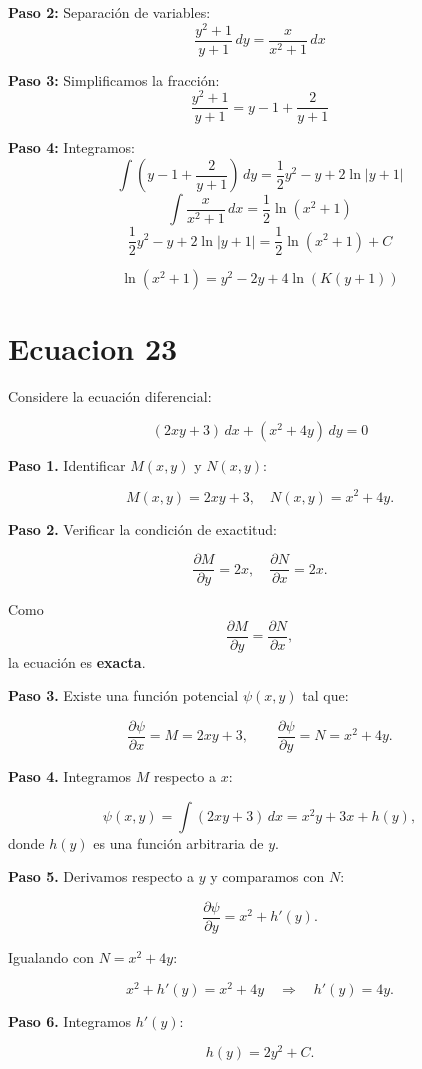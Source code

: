 \documentclass[12pt,a4paper]{article}
\begin{document}
\begin{multicols}{2}
	\textbf{Paso 2:} Separación de variables:
	\[
	\frac{y^2 + 1}{y + 1}\,dy = \frac{x}{x^2 + 1}\,dx
	\]
	
	\textbf{Paso 3:} Simplificamos la fracción:
	\[
	\frac{y^2 + 1}{y + 1} = y - 1 + \frac{2}{y + 1}
	\]
	
	\textbf{Paso 4:} Integramos:
	\[
	\int (y - 1 + \frac{2}{y + 1})\,dy = \frac{1}{2}y^2 - y + 2\ln|y + 1|
	\]
	\[
	\int \frac{x}{x^2 + 1}\,dx = \frac{1}{2}\ln(x^2 + 1)
	\]
	\[
	\frac{1}{2}y^2 - y + 2\ln|y + 1| = \frac{1}{2}\ln(x^2 + 1) + C
	\]
	
	\[
	\boxed{\ln(x^2 + 1) = y^2 - 2y + 4\ln(K(y + 1))}
	\]
	\section*{Ecuacion 23}
	
	Considere la ecuación diferencial:
	
	\[
	(2xy + 3)\,dx + (x^2 + 4y)\,dy = 0
	\]
	
	\textbf{Paso 1.} Identificar \(M(x,y)\) y \(N(x,y)\):
	
	\[
	M(x,y) = 2xy + 3, \quad N(x,y) = x^2 + 4y.
	\]
	
	\textbf{Paso 2.} Verificar la condición de exactitud:
	
	\[
	\frac{\partial M}{\partial y} = 2x, \quad \frac{\partial N}{\partial x} = 2x.
	\]
	
	Como 
	\[
	\frac{\partial M}{\partial y} = \frac{\partial N}{\partial x},
	\]
	la ecuación es \textbf{exacta}.
	
	\textbf{Paso 3.} Existe una función potencial \(\psi(x,y)\) tal que:
	
	\[
	\frac{\partial \psi}{\partial x} = M = 2xy + 3, \qquad
	\frac{\partial \psi}{\partial y} = N = x^2 + 4y.
	\]
	
	\textbf{Paso 4.} Integramos \(M\) respecto a \(x\):
	
	\[
	\psi(x,y) = \int (2xy + 3)\,dx = x^2y + 3x + h(y),
	\]
	donde \(h(y)\) es una función arbitraria de \(y\).
	
	\textbf{Paso 5.} Derivamos respecto a \(y\) y comparamos con \(N\):
	
	\[
	\frac{\partial \psi}{\partial y} = x^2 + h'(y).
	\]
	
	Igualando con \(N = x^2 + 4y\):
	
	\[
	x^2 + h'(y) = x^2 + 4y \quad \Rightarrow \quad h'(y) = 4y.
	\]
	
	\textbf{Paso 6.} Integramos \(h'(y)\):
	
	\[
	h(y) = 2y^2 + C.
	\]
	

\end{multicols}
\end{document}
